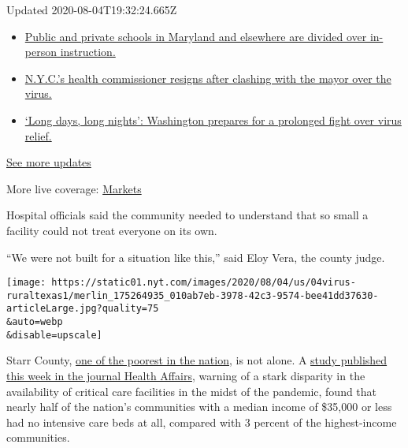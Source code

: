Updated 2020-08-04T19:32:24.665Z

\begin{itemize}
\tightlist
\item
  \href{https://www.nytimes.com/2020/08/04/world/coronavirus-cases.html?action=click\&pgtype=Article\&state=default\&region=MAIN_CONTENT_1\&context=storylines_live_updates\#link-4825b93}{Public
  and private schools in Maryland and elsewhere are divided over
  in-person instruction.}
\item
  \href{https://www.nytimes.com/2020/08/04/world/coronavirus-cases.html?action=click\&pgtype=Article\&state=default\&region=MAIN_CONTENT_1\&context=storylines_live_updates\#link-4d1eafa8}{N.Y.C.'s
  health commissioner resigns after clashing with the mayor over the
  virus.}
\item
  \href{https://www.nytimes.com/2020/08/04/world/coronavirus-cases.html?action=click\&pgtype=Article\&state=default\&region=MAIN_CONTENT_1\&context=storylines_live_updates\#link-6b644638}{`Long
  days, long nights': Washington prepares for a prolonged fight over
  virus relief.}
\end{itemize}

\href{https://www.nytimes.com/2020/08/04/world/coronavirus-cases.html?action=click\&pgtype=Article\&state=default\&region=MAIN_CONTENT_1\&context=storylines_live_updates}{See
more updates}

More live coverage:
\href{https://www.nytimes.com/live/2020/08/04/business/stock-market-today-coronavirus?action=click\&pgtype=Article\&state=default\&region=MAIN_CONTENT_1\&context=storylines_live_updates}{Markets}

Hospital officials said the community needed to understand that so small
a facility could not treat everyone on its own.

``We were not built for a situation like this,'' said Eloy Vera, the
county judge.

\texttt{[image: https://static01.nyt.com/images/2020/08/04/us/04virus-ruraltexas1/merlin\_175264935\_010ab7eb-3978-42c3-9574-bee41dd37630-articleLarge.jpg?quality=75\\\&auto=webp\\\&disable=upscale]}

Starr County,
\href{https://www.usatoday.com/story/money/2019/01/25/poorest-counties-in-the-us-median-household-income/38870175/}{one
of the poorest in the nation}, is not alone. A
\href{https://www.healthaffairs.org/doi/10.1377/hlthaff.2020.00581}{study
published this week in the journal Health Affairs}, warning of a stark
disparity in the availability of critical care facilities in the midst
of the pandemic, found that nearly half of the nation's communities with
a median income of \$35,000 or less had no intensive care beds at all,
compared with 3 percent of the highest-income communities.

